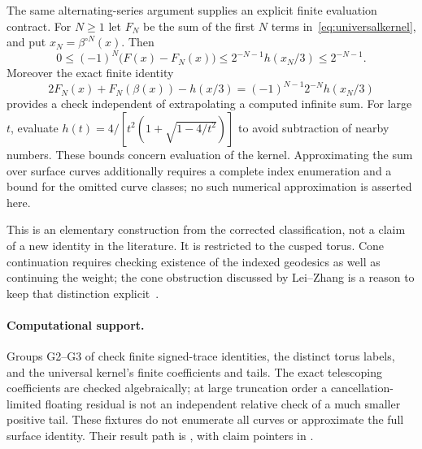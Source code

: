 The same alternating-series argument supplies an explicit finite
evaluation contract. For $N\geq1$ let $F_N$ be the sum of the first $N$
terms in~\eqref{eq:universalkernel}, and put $x_N=\beta^{\circ N}(x)$.
Then
\begin{equation}
 0\leq(-1)^N\bigl(F(x)-F_N(x)\bigr)
 \leq 2^{-N-1}h(x_N/3)\leq 2^{-N-1}.
 \label{eq:figurekerneltail}
\end{equation}
Moreover the exact finite identity
\begin{equation}
 2F_N(x)+F_N(\beta(x))-h(x/3)
   =(-1)^{N-1}2^{-N}h(x_N/3)
 \label{eq:figurefiniteidentity}
\end{equation}
provides a check independent of extrapolating a computed infinite sum.
For large $t$, evaluate
$h(t)=4/[t^2(1+\sqrt{1-4/t^2})]$ to avoid subtraction of nearby numbers.
These bounds concern evaluation of the kernel. Approximating the sum over
surface curves additionally requires a complete index enumeration and a
bound for the omitted curve classes; no such numerical approximation is
asserted here.

This is an elementary construction from the corrected classification,
not a claim of a new identity in the literature. It is restricted to the
cusped torus. Cone continuation requires checking existence of the indexed
geodesics as well as continuing the weight; the cone obstruction discussed
by Lei--Zhang is a reason to keep that distinction explicit~\cite{LeiZhang}.

\paragraph{Computational support.}
Groups G2--G3 of 
check finite signed-trace identities, the distinct torus labels,
and the universal kernel's finite coefficients and tails.
The exact telescoping coefficients are checked algebraically;
at large truncation order a cancellation-limited floating residual
is not an independent relative check of a much smaller positive tail.
These fixtures do not enumerate all curves or approximate the full
surface identity. Their result path is
, with claim pointers in
.
